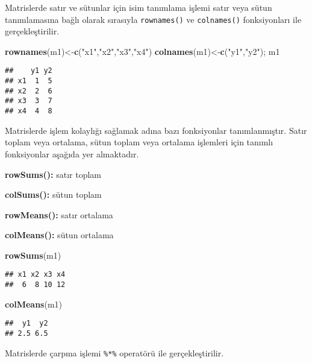 \documentclass[
]{book}
\newenvironment{Shaded}{\begin{snugshade}}{\end{snugshade}}
\newcommand{\KeywordTok}[1]{\textcolor[rgb]{0.13,0.29,0.53}{\textbf{#1}}}
\newcommand{\NormalTok}[1]{#1}
\newcommand{\StringTok}[1]{\textcolor[rgb]{0.31,0.60,0.02}{#1}}
\begin{document}
Matrislerde satır ve sütunlar için isim tanımlama işlemi satır veya sütun tanımlamasına bağlı olarak sırasıyla \texttt{rownames()} ve \texttt{colnames()} fonksiyonları ile gerçekleştirilir.

\begin{Shaded}
\begin{Highlighting}[]
\KeywordTok{rownames}\NormalTok{(m1)<-}\KeywordTok{c}\NormalTok{(}\StringTok{"x1"}\NormalTok{,}\StringTok{"x2"}\NormalTok{,}\StringTok{"x3"}\NormalTok{,}\StringTok{"x4"}\NormalTok{)}
\KeywordTok{colnames}\NormalTok{(m1)<-}\KeywordTok{c}\NormalTok{(}\StringTok{"y1"}\NormalTok{,}\StringTok{"y2"}\NormalTok{); m1}
\end{Highlighting}
\end{Shaded}

\begin{verbatim}
##    y1 y2
## x1  1  5
## x2  2  6
## x3  3  7
## x4  4  8
\end{verbatim}

Matrislerde işlem kolaylığı sağlamak adına bazı fonksiyonlar tanımlanmıştır. Satır toplam veya ortalama, sütun toplam veya ortalama işlemleri için tanımlı fonksiyonlar aşağıda yer almaktadır.

\textbf{rowSums():} satır toplam

\textbf{colSums():} sütun toplam

\textbf{rowMeans():} satır ortalama

\textbf{colMeans():} sütun ortalama

\begin{Shaded}
\begin{Highlighting}[]
\KeywordTok{rowSums}\NormalTok{(m1)}
\end{Highlighting}
\end{Shaded}

\begin{verbatim}
## x1 x2 x3 x4
##  6  8 10 12
\end{verbatim}

\begin{Shaded}
\begin{Highlighting}[]
\KeywordTok{colMeans}\NormalTok{(m1)}
\end{Highlighting}
\end{Shaded}

\begin{verbatim}
##  y1  y2
## 2.5 6.5
\end{verbatim}

Matrislerde çarpma işlemi \texttt{\%*\%} operatörü ile gerçekleştirilir.
\end{document}
